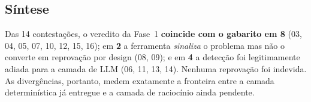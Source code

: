 \documentclass[12pt,a4paper]{article}
\begin{document}
\subsection*{Síntese}

Das 14 contestações, o veredito da Fase~1 \textbf{coincide com o gabarito em 8}
(03, 04, 05, 07, 10, 12, 15, 16); em \textbf{2} a ferramenta \emph{sinaliza} o
problema mas não o converte em reprovação por design (08, 09); e em \textbf{4} a
detecção foi legitimamente adiada para a camada de LLM (06, 11, 13, 14).
Nenhuma reprovação foi indevida. As divergências, portanto, medem exatamente a
fronteira entre a camada determinística já entregue e a camada de raciocínio
ainda pendente.
\end{document}
